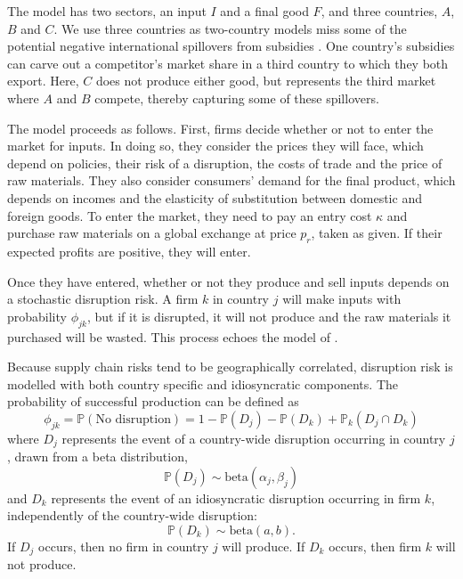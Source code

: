 \documentclass{article}
\begin{document}
The model has two sectors, an input $I$ and a final good $F$, and three countries, $A$, $B$ and $C$. We use three countries as two-country models miss some of the potential negative international spillovers from subsidies \parencite{bown_wtoing_2019}. One country's subsidies can carve out a competitor's market share in a third country to which they both export. Here, $C$ does not produce either good, but represents the third market where $A$ and $B$ compete, thereby capturing some of these spillovers. 

The model proceeds as follows. First, firms decide whether or not to enter the market for inputs. In doing so, they consider the prices they will face, which depend on policies, their risk of a disruption, the costs of trade and the price of raw materials. They also consider consumers' demand for the final product, which depends on incomes and the elasticity of substitution between domestic and foreign goods. To enter the market, they need to pay an entry cost $\kappa$ and purchase raw materials on a global exchange at price $p_r$, taken as given. If their expected profits are positive, they will enter.

Once they have entered, whether or not they produce and sell inputs depends on a stochastic disruption risk. A firm $k$ in country $j$ will make inputs with probability $\phi_{jk}$, but if it is disrupted, it will not produce and the raw materials it purchased will be wasted. This process echoes the model of \textcite{bimpikis_supply_2019}.

Because supply chain risks tend to be geographically correlated, disruption risk is modelled with both country specific and idiosyncratic components. The probability of successful production can be defined as
\begin{equation}\label{eq:phi}
    \phi_{jk} = \mathbb{P}(\text{No disruption}) = 1 - \mathbb{P}(D_{j}) - \mathbb{P}(D_{k})  + \mathbb{P}_{k}(D_{j} \cap D_{k})
\end{equation} 
where $D_j$ represents the event of a country-wide disruption occurring in country $j$, drawn from a beta distribution,
\begin{equation}\label{eq:pdj}
    \mathbb{P}(D_{j}) \sim \text{beta}(\alpha_j, \beta_j)
\end{equation}
and $D_k$ represents the event of an idiosyncratic disruption occurring in firm $k$, independently of the country-wide disruption:
\begin{equation}\label{eq:pdk}
    \mathbb{P}(D_{k}) \sim \text{beta}(a, b).
\end{equation}
If $D_j$ occurs, then no firm in country $j$ will produce. If $D_k$ occurs, then firm $k$ will not produce.
\end{document}
